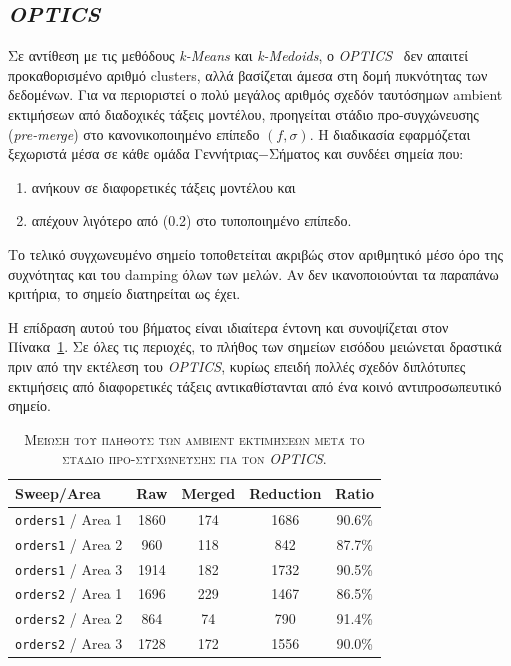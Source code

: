 \documentclass[a4paper,12pt,twoside,openright]{report}
\begin{document}
\subsection{\textit{OPTICS}}
Σε αντίθεση με τις μεθόδους \textit{k-Means} και \textit{k-Medoids}, ο \textit{OPTICS}~\cite{optics1999} δεν απαιτεί προκαθορισμένο αριθμό clusters, αλλά βασίζεται άμεσα στη δομή πυκνότητας των δεδομένων. Για να περιοριστεί ο πολύ μεγάλος αριθμός σχεδόν ταυτόσημων ambient εκτιμήσεων από διαδοχικές τάξεις μοντέλου, προηγείται στάδιο προ-συγχώνευσης (\textit{pre-merge}) στο κανονικοποιημένο επίπεδο \((f,\sigma)\). Η διαδικασία εφαρμόζεται ξεχωριστά μέσα σε κάθε ομάδα Γεννήτριας$-$Σήματος και συνδέει σημεία που:
\begin{enumerate}
\item[(α)] ανήκουν σε διαφορετικές τάξεις μοντέλου και
\item[(β)] απέχουν λιγότερο από (0.2) στο τυποποιημένο επίπεδο.
\end{enumerate}

Το τελικό συγχωνευμένο σημείο τοποθετείται ακριβώς στον αριθμητικό μέσο όρο της συχνότητας και του damping όλων των μελών. Αν δεν ικανοποιούνται τα παραπάνω κριτήρια, το σημείο διατηρείται ως έχει.

Η επίδραση αυτού του βήματος είναι ιδιαίτερα έντονη και συνοψίζεται στον Πίνακα~\ref{tab:optics_merge_summary_ambient}. Σε όλες τις περιοχές, το πλήθος των σημείων εισόδου μειώνεται δραστικά πριν από την εκτέλεση του \textit{OPTICS}, κυρίως επειδή πολλές σχεδόν διπλότυπες εκτιμήσεις από διαφορετικές τάξεις αντικαθίστανται από ένα κοινό αντιπροσωπευτικό σημείο.

\begin{table}[!t]
\centering
\caption{\textsc{Μείωση του πλήθους των ambient εκτιμήσεων μετά το στάδιο προ-συγχώνευσης για τον \textit{OPTICS}.}}
\label{tab:optics_merge_summary_ambient}
\footnotesize
\renewcommand{\arraystretch}{1.2}
\setlength{\tabcolsep}{4pt}
\begin{tabular}{lcccc}
\toprule
\textbf{Sweep/Area} & \textbf{Raw} & \textbf{Merged} & \textbf{Reduction} & \textbf{Ratio} \\
\midrule
\texttt{orders1} / Area 1 & 1860 & 174 & 1686 & 90.6\% \\
\texttt{orders1} / Area 2 & 960  & 118 & 842  & 87.7\% \\
\texttt{orders1} / Area 3 & 1914 & 182 & 1732 & 90.5\% \\
\texttt{orders2} / Area 1 & 1696 & 229 & 1467 & 86.5\% \\
\texttt{orders2} / Area 2 & 864  & 74  & 790  & 91.4\% \\
\texttt{orders2} / Area 3 & 1728 & 172 & 1556 & 90.0\% \\
\bottomrule
\end{tabular}
\end{table}
\end{document}

